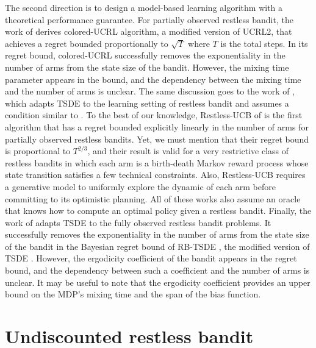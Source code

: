 The second direction is to design a model-based learning algorithm with a theoretical performance guarantee.
For partially observed restless bandit, the work of \cite{ortner2012regret} derives colored-UCRL algorithm, a modified version of UCRL2, that achieves a regret bounded proportionally to $\sqrt{T}$ where $T$ is the total steps.
In its regret bound, colored-UCRL successfully removes the exponentiality in the number of arms from the state size of the bandit.
However, the mixing time parameter appears in the bound, and the dependency between the mixing time and the number of arms is unclear.
The same discussion goes to the work of \cite{jung2019thompson}, which adapts TSDE \cite{ouyang2017learning} to the learning setting of restless bandit and assumes a condition similar to \cite{ortner2012regret}.
To the best of our knowledge, Restless-UCB of \cite{wang2020restless} is the first algorithm that has a regret bounded explicitly linearly in the number of arms for partially observed restless bandits.
Yet, we must mention that their regret bound is proportional to $T^{2/3}$, and their result is valid for a very restrictive class of restless bandits in which each arm is a birth-death Markov reward process whose state transition satisfies a few technical constraints.
Also, Restless-UCB requires a generative model to uniformly explore the dynamic of each arm before committing to its optimistic planning.
All of these works also assume an oracle that knows how to compute an optimal policy given a restless bandit.
Finally, the work of \cite{akbarzadeh2022learning} adapts TSDE \cite{ouyang2017learning} to the fully observed restless bandit problems.
It successfully removes the exponentiality in the number of arms from the state size of the bandit in the Bayesian regret bound of RB-TSDE \cite{akbarzadeh2022learning}, the modified version of TSDE \cite{ouyang2017learning}.
However, the ergodicity coefficient of the bandit appears in the regret bound, and the dependency between such a coefficient and the number of arms is unclear.
It may be useful to note that the ergodicity coefficient provides an upper bound on the MDP's mixing time and the span of the bias function.


\section{Undiscounted restless bandit}
\label{ch:restless:sec:restless}

